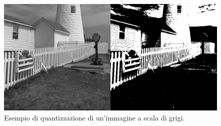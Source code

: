 \documentclass{subfiles}
\begin{document}
\begin{figure}[!h]
    \centering
    \includegraphics[scale = 0.325]{../Images/Lighthouse/LighthouseComparison.png}
    \caption{Esempio di quantizzazione di un'immagine a scala di grigi.}
    \label{fig:5.3}
\end{figure}
\end{document}
